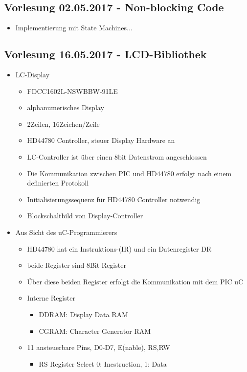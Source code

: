 \subsection{Vorlesung 02.05.2017 - Non-blocking Code}
\begin{itemize}
	\item Implementierung mit State Machines...
\end{itemize}

\subsection{Vorlesung 16.05.2017 - LCD-Bibliothek}
\begin{itemize}
	\item LC-Display
	\begin{itemize}
		\item FDCC1602L-NSWBBW-91LE
		\item alphanumerisches Display
		\item 2Zeilen, 16Zeichen/Zeile
		\item HD44780 Controller, steuer Display Hardware an
		\item LC-Controller ist über einen 8bit Datenstrom angeschlossen
		\item Die Kommunikation zwischen PIC und HD44780 erfolgt nach einem definierten Protokoll
		\item Initialisierungssequenz für HD44780 Controller notwendig
		\item Blockschaltbild von Display-Controller
	\end{itemize}
	\item Aus Sicht des uC-Programmierers
	\begin{itemize}
		\item HD44780 hat ein Instruktions-(IR) und ein Datenregister DR
		\item beide Register sind 8Bit Register
		\item Über diese beiden Register erfolgt die Kommunikation mit dem PIC uC
		\item Interne Register
		\begin{itemize}
			\item DDRAM: Display Data RAM
			\item CGRAM: Character Generator RAM
		\end{itemize}			
		\item 11 ansteuerbare Pins, D0-D7, E(nable), RS,RW
		\begin{itemize}
			\item RS Register Select 0: Incstruction, 1: Data

\end{itemize}
\end{itemize}
\end{itemize}
